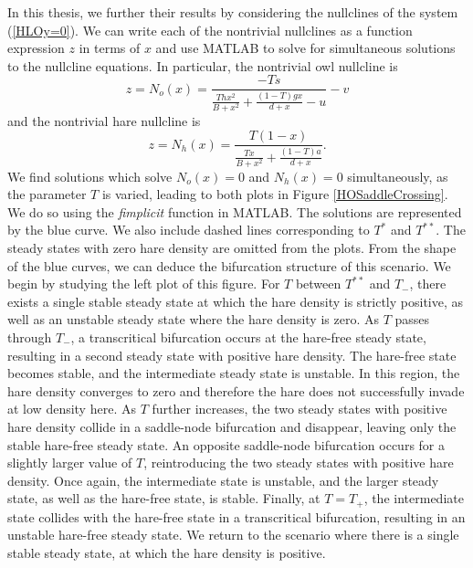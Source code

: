 \documentclass[12pt]{UOthesis}
\theoremstyle{remarkstyle}
\begin{document}
In this thesis, we further their results by considering the nullclines of the system (\ref{HLOy=0}). We can write each of the nontrivial nullclines as a function expression $z$ in terms of $x$ and use MATLAB to solve for simultaneous solutions to the nullcline equations. In particular, the nontrivial owl nullcline is
$$z=N_o(x)=\frac{-Ts}{\frac{Thx^2}{B+x^2}+\frac{(1-T)gx}{d+x}-u}-v$$
and the nontrivial hare nullcline is
$$z=N_h(x)=\frac{T(1-x)}{\frac{Tx}{B+x^2}+\frac{(1-T)a}{d+x}}.$$
We find solutions which solve $N_o(x)=0$ and $N_h(x)=0$ simultaneously, as the parameter $T$ is varied, leading to both plots in Figure \ref{HOSaddleCrossing}. We do so using the \textit{fimplicit} function in MATLAB. The solutions are represented by the blue curve. We also include dashed lines corresponding to $T^*$ and $T^{**}$. The steady states with zero hare density are omitted from the plots. From the shape of the blue curves, we can deduce the bifurcation structure of this scenario. We begin by studying the left plot of this figure. For $T$ between $T^{**}$ and $T_-$, there exists a single stable steady state at which the hare density is strictly positive, as well as an unstable steady state where the hare density is zero. As $T$ passes through $T_-$, a transcritical bifurcation occurs at the hare-free steady state, resulting in a second steady state with positive hare density. The hare-free state becomes stable, and the intermediate steady state is unstable. In this region, the hare density converges to zero and therefore the hare does not successfully invade at low density here. As $T$ further increases, the two steady states with positive hare density collide in a saddle-node bifurcation and disappear, leaving only the stable hare-free steady state. An opposite saddle-node bifurcation occurs for a slightly larger value of $T$, reintroducing the two steady states with positive hare density. Once again, the intermediate state is unstable, and the larger steady state, as well as the hare-free state, is stable. Finally, at $T=T_+$, the intermediate state collides with the hare-free state in a transcritical bifurcation, resulting in an unstable hare-free steady state. We return to the scenario where there is a single stable steady state, at which the hare density is positive.\\
\end{document}
